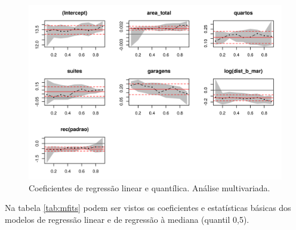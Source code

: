\documentclass[a4paper, 12pt]{article}
\begin{document}
\begin{figure}[H]

{\centering \includegraphics[width=1\linewidth]{images/coefs-1} 

}

\caption{Coeficientes de regressão linear e quantílica. Análise multivariada.}\label{fig:coefs}
\end{figure}

Na tabela \ref{tab:mfits} podem ser vistos os coeficientes e
estatísticas básicas dos modelos de regressão linear e de regressão à
mediana (quantil 0,5).
\end{document}
